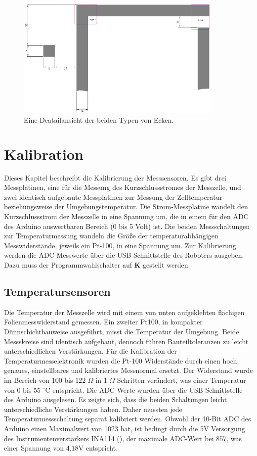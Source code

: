 \documentclass[a4paper,bibtotoc,oneside]{scrbook}
\begin{document}
\begin{figure}[htbp]
\centering
\includegraphics[width=100mm]{img/detail.png}
\caption{Eine Deatailansicht der beiden Typen von Ecken.}\label{ecken}
\end{figure}



\chapter{Kalibration}\thispagestyle{empty}

Dieses Kapitel beschreibt die Kalibrierung der Messsensoren. Es gibt drei Messplatinen, eine für die Messung des Kurzschlussstromes der Messzelle, und zwei identisch aufgebaute Messplatinen zur Messung der Zelltemperatur beziehungsweise der Umgebungstemperatur. Die Strom-Messplatine wandelt den Kurzschlussstrom der Messzelle in eine Spannung um, die in einem für den ADC des Arduino auswertbaren Bereich (0 bis 5 Volt) ist. Die beiden Messschaltungen zur Temperaturmessung wandeln die Größe der temperaturabhängigen Messwiderstände, jeweils ein Pt-100, in eine Spannung um.
Zur Kalibrierung werden die ADC-Messwerte über die USB-Schnittstelle des Roboters ausgeben. Dazu muss der Programmwahlschalter auf \textbf{K} gestellt werden.


\section{Temperatursensoren}\thispagestyle{empty}
Die Temperatur der Messzelle wird mit einem von unten aufgeklebten flächigen Folienmesswiderstand gemessen. 
Ein zweiter Pt100, in kompakter Dünnschichtbauweise ausgeführt, misst die Temperatur der Umgebung. Beide Messskreise sind identisch aufgebaut, dennoch führen Bauteiltoleranzen zu leicht unterschiedlichen Verstärkungen.
Für die Kalibration der Temperaturmesselektronik wurden die Pt-100 Widerstände durch einen hoch genaues, einstellbares und kalibriertes Messnormal ersetzt. Der Widerstand wurde im Bereich von 100 bis 122 	$\Omega$  in 1 $\Omega$  Schritten verändert, was einer Temperatur von 0 bis 55 $^{\circ}$C entspricht. Die ADC-Werte wurden über die USB-Schnittstelle des Arduino ausgelesen. Es zeigte sich, dass die beiden Schaltungen leicht unterschiedliche Verstärkungen haben. Daher mussten jede Temperaturmessschaltung separat kalibriert werden.
Obwohl der 10-Bit ADC des Arduino einen Maximalwert von 1023 hat, ist bedingt durch die 5V Versorgung des Instrumentenverstärkers INA114 (\cite{ina114}), der maximale ADC-Wert bei 857, was einer Spannung von 4,18V entspricht.  
\end{document}
